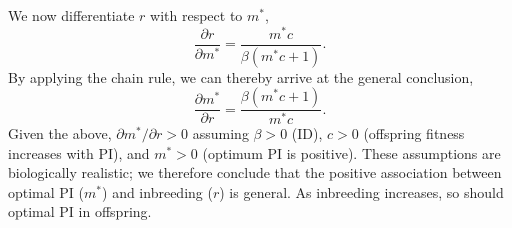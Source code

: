 \documentclass[12pt]{article}
\makeatletter
\renewcommand\section{\@startsection{section}{1}{0in}{-0.5\baselineskip}{0.1\baselineskip}{\normalfont\large\bfseries}}
\makeatother
\begin{document}
We now differentiate $r$ with respect to $m^{*}$,
\begin{equation}
\frac{\partial r}{\partial m^{*}} = \frac{m^{*} c}{\beta \left(m^{*} c + 1\right)}. 
\end{equation}
By applying the chain rule, we can thereby arrive at the general conclusion,
\begin{equation}
\frac{\partial m^{*}}{\partial r} = \frac{\beta \left(m^{*} c + 1\right)}{m^{*} c}. 
\end{equation} 
Given the above, $\partial m^{*} / \partial r > 0$ assuming $\beta>0$ (ID), $c>0$ (offspring fitness increases with PI), and $m^{*}>0$ (optimum PI is positive). These assumptions are biologically realistic; we therefore conclude that the positive association between optimal PI ($m^{*}$) and inbreeding ($r$) is general. As inbreeding increases, so should optimal PI in offspring.


\end{document}
